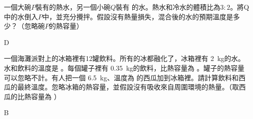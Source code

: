 {
    一個大碗$P$裝有的熱水，另一個小碗$Q$裝有  的水。熱水和冷水的體積比為$3:2$。將Q中的水倒入$P$中，並充分攪拌。假設沒有熱量損失，混合後的水的預期溫度是多少？（忽略碗$P$的熱容量）
    \begin{choices}
        \choice {}
        \choice {}
        \choice {}
        \CorrectChoice {}
    \end{choices}
}{\mckey D}

{
    一個海灘派對上的冰箱裡有12罐飲料。所有的冰都融化了，冰箱裡有 \qty{2}{kg}的水。水和飲料的溫度是 。每個罐子裡有 \qty{0.35}{kg}的飲料，比熱容量為 。罐子的熱容量可以忽略不計。有人把一個 \qty{6.5}{kg}、溫度為 的西瓜加到冰箱裡。請計算飲料和西瓜的最終溫度。忽略冰箱的熱容量，並假設沒有吸收來自周圍環境的熱量。（取西瓜的比熱容量為 ）
    \begin{choices}
        \choice {}
        \CorrectChoice {}
        \choice {}
        \choice {}
    \end{choices}
}{\mckey B}